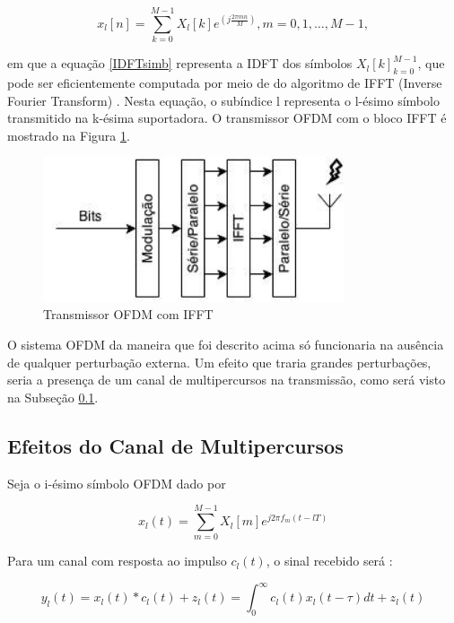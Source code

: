 \begin{equation}\label{IDFTsimb}
x_{l}[n] = \sum_{k=0}^{M-1}X_{l}[k]e^{(j\frac{2\pi m n}{M})}, m=0,1,…,M-1,
\end{equation}

em que a equação \ref{IDFTsimb} representa a IDFT dos símbolos $X_{l}[k]_{k=0}^{M-1}$, que pode ser eficientemente computada por meio de do algoritmo de IFFT (Inverse Fourier Transform) \cite{tcc9}. Nesta equação, o subíndice l representa o l-ésimo símbolo transmitido na k-ésima suportadora.  O transmissor OFDM com o bloco IFFT é mostrado na Figura \ref{transIFFT}.

\begin{figure}[h!]
\centering
\includegraphics[width=3.5in]{transOFDMIFFT.png} %
\caption{Transmissor OFDM com IFFT}
\label{transIFFT}
\end{figure}

\par O sistema OFDM da maneira que foi descrito acima só funcionaria na ausência de qualquer perturbação externa. Um efeito que traria grandes perturbações, seria a presença de um canal de multipercursos na transmissão, como será visto na Subseção \ref{multipercurso}. 

\subsection{Efeitos do Canal de Multipercursos}\label{multipercurso}

Seja o i-ésimo símbolo OFDM dado por \cite{tcc9}

\begin{equation}
x_{l}(t) = \sum_{m=0}^{M-1}X_{l}[m]e^{j 2 \pi f_{m}(t-lT)}
\end{equation}
	
\par Para um canal com resposta ao impulso $c_{l}(t)$, o sinal recebido será \cite{tcc9}:

\begin{equation}\label{eq3}
y_{l} (t)= x_{l}(t)\ast c_{l}(t)+ z_{l}(t)= \int_{0}^{\infty} c_{l}(t)x_{l}(t-\tau)dt+ z_{l}(t)
\end{equation}

